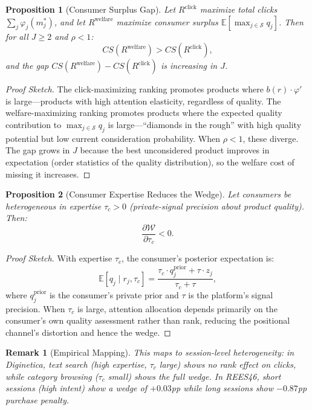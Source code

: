 \documentclass[12pt]{article}
\newtheorem{proposition}{Proposition}
\newtheorem{remark}{Remark}
\begin{document}
\begin{proposition}[Consumer Surplus Gap]\label{prop:welfare}
Let $R^{\text{click}}$ maximize total clicks $\sum_j \varphi_j(m_j^*)$, and let $R^{\text{welfare}}$ maximize consumer surplus $\mathbb{E}[\max_{j \in \mathcal{S}} q_j]$. Then for all $J \geq 2$ and $\rho < 1$:
\begin{equation}
    CS(R^{\text{welfare}}) > CS(R^{\text{click}}),
\end{equation}
and the gap $CS(R^{\text{welfare}}) - CS(R^{\text{click}})$ is increasing in $J$.
\end{proposition}

\begin{proof}[Proof Sketch]
The click-maximizing ranking promotes products where $b(r) \cdot \varphi'$ is large---products with high attention elasticity, regardless of quality. The welfare-maximizing ranking promotes products where the expected quality contribution to $\max_{j \in \mathcal{S}} q_j$ is large---``diamonds in the rough'' with high quality potential but low current consideration probability. When $\rho < 1$, these diverge. The gap grows in $J$ because the best unconsidered product improves in expectation (order statistics of the quality distribution), so the welfare cost of missing it increases.
\end{proof}

\begin{proposition}[Consumer Expertise Reduces the Wedge]\label{prop:expertise}
Let consumers be heterogeneous in expertise $\tau_c > 0$ (private-signal precision about product quality). Then:
\begin{equation}
    \frac{\partial \mathcal{W}}{\partial \tau_c} < 0.
\end{equation}
\end{proposition}

\begin{proof}[Proof Sketch]
With expertise $\tau_c$, the consumer's posterior expectation is:
\[
    \mathbb{E}[q_j \mid r_j, \tau_c] = \frac{\tau_c \cdot q_j^{\text{prior}} + \tau \cdot z_j}{\tau_c + \tau},
\]
where $q_j^{\text{prior}}$ is the consumer's private prior and $\tau$ is the platform's signal precision. When $\tau_c$ is large, attention allocation depends primarily on the consumer's own quality assessment rather than rank, reducing the positional channel's distortion and hence the wedge.
\end{proof}

\begin{remark}[Empirical Mapping]
This maps to session-level heterogeneity: in Diginetica, text search (high expertise, $\tau_c$ large) shows no rank effect on clicks, while category browsing ($\tau_c$ small) shows the full wedge. In REES46, short sessions (high intent) show a wedge of $+0.03$pp while long sessions show $-0.87$pp purchase penalty.
\end{remark}
\end{document}
